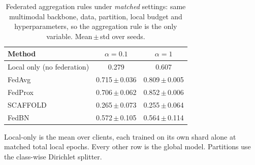 \begin{table}[t]
\caption{Federated aggregation rules under \emph{matched} settings: same multimodal backbone, data, partition, local budget and hyperparameters, so the aggregation rule is the only variable. Mean\,$\pm$\,std over seeds.}
\label{tab:baselines}
\centering\footnotesize
\setlength\tabcolsep{5pt}
\begin{tabular}{lcc}
\toprule
\textbf{Method} & $\alpha=0.1$ & $\alpha=1$\\
\midrule
Local only (no federation) & 0.279 & 0.607 \\
\midrule
FedAvg & 0.715\,$\pm$\,0.036 & 0.809\,$\pm$\,0.005 \\
FedProx & 0.706\,$\pm$\,0.062 & 0.852\,$\pm$\,0.006 \\
SCAFFOLD & 0.265\,$\pm$\,0.073 & 0.255\,$\pm$\,0.064 \\
FedBN & 0.572\,$\pm$\,0.105 & 0.564\,$\pm$\,0.114 \\
\bottomrule
\end{tabular}
\vspace{1pt}

{\scriptsize Local-only is the mean over clients, each trained on its own shard alone at matched total local epochs. Every other row is the global model. Partitions use the class-wise Dirichlet splitter.}
\end{table}
